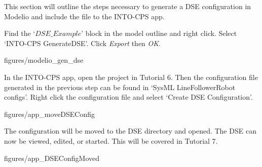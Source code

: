 \documentclass[11pt,a4paper]{../tutorial}
\begin{document}
This section will outline the steps necessary to generate a DSE configuration in Modelio and include the file to the INTO-CPS app.

\begin{instructions}

\item Find the `$DSE\_Example$' block in the model outline and right click. Select `INTO-CPS \menusep GenerateDSE'. Click \emph{Export} then \emph{OK}.

\begin{center}
\begin{annotation}[width=0.7\linewidth]{figures/modelio_gen_dse}
    \end{annotation}
\end{center}


\item In the INTO-CPS app, open the project in Tutorial 6. Then the configuration file generated in the previous step can be found in `SysML \menusep LineFollowerRobot \menusep configs'. Right click the configuration file and select `Create DSE Configuration'.

\begin{center}
\begin{annotation}[width=0.7\linewidth]{figures/app_moveDSEConfig}
    \end{annotation}
\end{center}

\newpage

The configuration will be moved to the DSE directory and opened. The DSE can now be viewed, edited, or started. This will be covered in Tutorial 7.

\begin{center}
\begin{annotation}[width=0.7\linewidth]{figures/app_DSEConfigMoved}
    \end{annotation}
\end{center}

\end{instructions}
\end{document}
